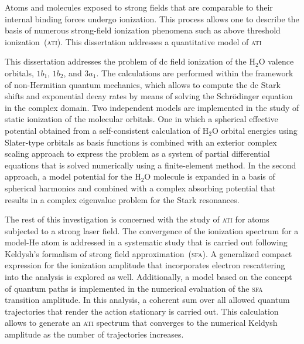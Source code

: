





Atoms and molecules exposed to strong fields that are comparable to
their internal binding forces undergo ionization. This process allows
one to describe the basis of numerous strong-field ionization
phenomena such as above threshold ionization~(\textsc{ati}).  This
dissertation addresses a quantitative model of \textsc{ati}


This dissertation addresses the problem of dc field ionization of the
H$_{2}$O valence orbitals, $1b_{1}$, $1b_{2}$, and $3a_{1}$. The
calculations are performed within the framework of non-Hermitian
quantum mechanics, which allows to compute the dc Stark shifts and
exponential decay rates by means of solving the Schr\"{o}dinger
equation in the complex domain. Two independent models are implemented
in the study of static ionization of the molecular orbitals. One in
which a spherical effective potential obtained from a self-consistent
calculation of H$_{2}$O orbital energies using Slater-type orbitals as
basis functions is combined with an exterior complex scaling approach
to express the problem as a system of partial differential equations
that is solved numerically using a finite-element method. In the
second approach, a model potential for the H$_{2}$O molecule is
expanded in a basis of spherical harmonics and combined with a complex
absorbing potential that results in a complex eigenvalue problem for
the Stark resonances.

The rest of this investigation is concerned with the study of
\textsc{ati} for atoms subjected to a strong laser field. The
convergence of the ionization spectrum for a model-He atom is
addressed in a systematic study that is carried out following
Keldysh's formalism of strong field approximation~(\textsc{sfa}). A
generalized compact expression for the ionization amplitude that
incorporates electron rescattering into the analysis is explored as
well. Additionally, a model based on the concept of quantum paths is
implemented in the numerical evaluation of the \textsc{sfa} transition
amplitude. In this analysis, a coherent sum over all allowed quantum
trajectories that render the action stationary is carried out. This
calculation allows to generate an \textsc{ati} spectrum that converges
to the numerical Keldysh amplitude as the number of trajectories
increases.







